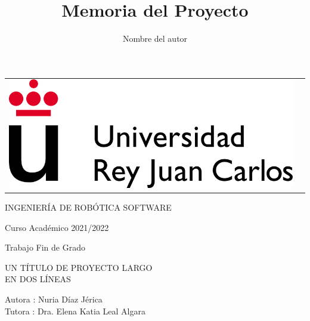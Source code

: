 \documentclass[a4paper, 12pt]{book}
\title{Memoria del Proyecto}
\author{Nombre del autor}
\begin{document}
 


\begin{titlepage}
\begin{center}
\begin{tabular}[c]{c c}
\includegraphics[scale=1.5]{img/LogoURJC.png}
\\
\end{tabular}

\vspace{3cm}

\Large 
INGENIERÍA DE ROBÓTICA SOFTWARE

\vspace{0.4cm}

\large
Curso Académico 2021/2022

\vspace{0.8cm}

Trabajo Fin de Grado

\vspace{2cm}

\LARGE UN TÍTULO DE PROYECTO LARGO\\
EN DOS LÍNEAS
\vspace{3cm}

\large
Autora : Nuria Díaz Jérica \\
Tutora : Dra. Elena Katia Leal Algara
\end{center}
\end{titlepage}
\end{document}
